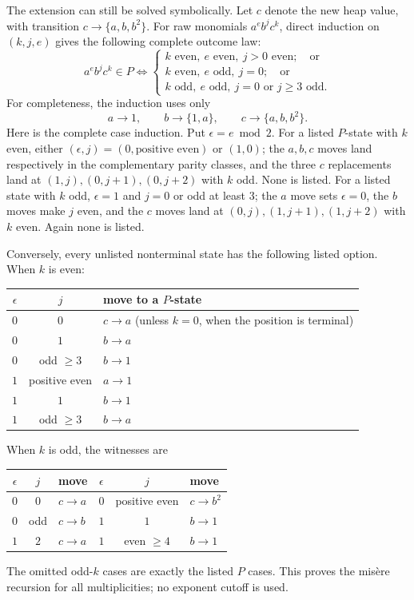 \documentclass[11pt]{article}
\theoremstyle{definition}
\theoremstyle{remark}
\begin{document}
The extension can still be solved symbolically.  Let $c$ denote the new
heap value, with transition $c\to\{a,b,b^2\}$.  For raw monomials
$a^e b^j c^k$, direct induction on $(k,j,e)$ gives the following complete
outcome law:
\begin{equation}
 a^e b^j c^k\in P
 \Longleftrightarrow
 \begin{cases}
 k\text{ even},\ e\text{ even},\ j>0\text{ even};\quad\text{or}\\
 k\text{ even},\ e\text{ odd},\ j=0;\quad\text{or}\\
 k\text{ odd},\ e\text{ odd},\ j=0\text{ or }j\ge3\text{ odd}.
 \end{cases}
\end{equation}
For completeness, the induction uses only
\[
 a\to1,\qquad b\to\{1,a\},\qquad c\to\{a,b,b^2\}.
\]
Here is the complete case induction.  Put $\epsilon=e\bmod2$.  For a listed
$P$-state with $k$ even, either $(\epsilon,j)=(0,\text{positive even})$
or $(1,0)$; the $a,b,c$ moves land respectively in the complementary
parity classes, and the three $c$ replacements land at
$(1,j),(0,j+1),(0,j+2)$ with $k$ odd.  None is listed.  For a listed state
with $k$ odd, $\epsilon=1$ and $j=0$ or odd at least $3$; the $a$ move
sets $\epsilon=0$, the $b$ moves make $j$ even, and the $c$ moves land at
$(0,j),(1,j+1),(1,j+2)$ with $k$ even.  Again none is listed.

Conversely, every unlisted nonterminal state has the following listed
option.  When $k$ is even:
\begin{center}
\small
\begin{tabular}{ccl}
\toprule
$\epsilon$ & $j$ & move to a $P$-state\\
\midrule
$0$ & $0$ & $c\to a$ (unless $k=0$, when the position is terminal)\\
$0$ & $1$ & $b\to a$\\
$0$ & odd $\ge3$ & $b\to1$\\
$1$ & positive even & $a\to1$\\
$1$ & $1$ & $b\to1$\\
$1$ & odd $\ge3$ & $b\to a$\\
\bottomrule
\end{tabular}
\end{center}
When $k$ is odd, the witnesses are
\begin{center}
\small
\begin{tabular}{ccl@{\qquad}ccl}
\toprule
$\epsilon$&$j$&move&$\epsilon$&$j$&move\\
\midrule
$0$&$0$&$c\to a$&$0$&positive even&$c\to b^2$\\
$0$&odd&$c\to b$&$1$&$1$&$b\to1$\\
$1$&$2$&$c\to a$&$1$&even $\ge4$&$b\to1$\\
\bottomrule
\end{tabular}
\end{center}
The omitted odd-$k$ cases are exactly the listed $P$ cases.  This proves the
mis\`ere recursion for all multiplicities; no exponent cutoff is used.
\end{document}
